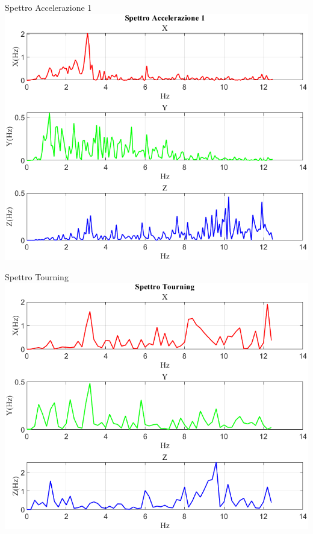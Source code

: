 \documentclass[beamer]{standalone}
\begin{document}
	\begin{frame}{{Spettro Accelerazione 1}}
		\centering\includegraphics[height=.8\textheight]{figure/Acc/Trasformata/Spettro Accelerazione 1}
	\end{frame}
	
	\begin{frame}{{Spettro Tourning}}
		\centering\includegraphics[height=.8\textheight]{figure/Acc/Trasformata/Spettro Tourning}
	\end{frame}
	
\end{document}
